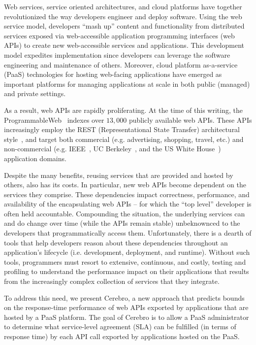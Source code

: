 Web services, service oriented architectures, and cloud platforms have together
revolutionized the way developers engineer and deploy software.
Using the web service model, developers ``mash up'' content and functionality 
from distributed services 
exposed via web-accessible application programming interfaces (web APIs)
to create new web-accessible services and applications.  
This development model expedites implementation since 
developers can leverage the 
software engineering and maintenance of others.
Moreover, cloud platform as-a-service (PaaS) technologies 
for hosting web-facing applications have emerged as important
platforms for managing applications at scale in both public (managed) and 
private settings.  

As a result, web APIs are rapidly 
proliferating.  At the time of this writing, 
the ProgrammableWeb~\cite{pweb} indexes over $13,000$
publicly available web APIs.
These APIs increasingly employ the REST (Representational State Transfer) 
architectural style~\cite{Fielding:2000:ASD:932295}, and target both
commercial (e.g. advertising, shopping, travel, etc.) and non-commercial
(e.g. IEEE~\cite{ieeeapis}, UC Berkeley~\cite{ucbapis}, and the US White
House~\cite{whitehouseapis}) application domains.

Despite the many benefits, reusing services that are provided and hosted
by others, also has its costs.  
In particular, new web APIs become dependent on the 
services they comprise.  These dependencies
impact correctness, performance, and availability of the encapsulating 
web APIs -- for which the ``top level'' developer is often held accountable.  
Compounding the situation, the underlying services can and do change over time
(while the APIs remain stable)
unbeknownced to the developers that programmatically access them.
Unfortunately, there is a dearth of tools that help developers reason about these 
dependencies throughout an application's 
lifecycle (i.e. development, deployment, and runtime).  Without such tools, 
programmers must resort to extensive, continuous, and costly, testing and profiling 
to understand the performance impact on their applications
that results from the increasingly complex collection of
services that they integrate.

To address this need, we present Cerebro, a new approach that
predicts bounds on 
the response-time performance of web
APIs exported by applications that are hosted by a PaaS platform.
The goal of Cerebro is to allow 
a PaaS administrator to determine what service-level agreement (SLA) can be
fulfilled (in terms of response time) 
by each API call exported by applications
hosted on the PaaS.  

